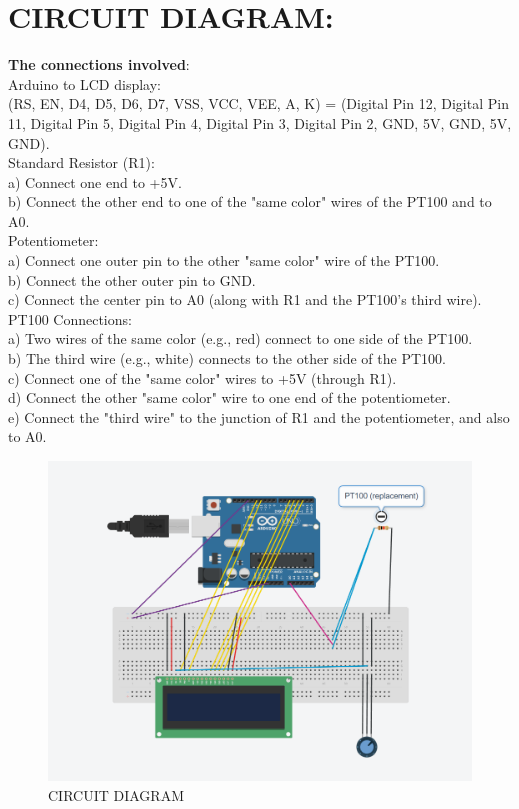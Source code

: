 \documentclass{article}
\begin{document}
\section{CIRCUIT DIAGRAM:}
\textbf{The connections involved}:\\
Arduino to LCD display:\\ 
(RS, EN, D4, D5, D6, D7, VSS, VCC, VEE, A, K) = (Digital Pin 12, Digital Pin 11, Digital Pin 5, Digital Pin 4, Digital Pin 3, Digital Pin 2, GND, 5V, GND, 5V, GND).\\
Standard Resistor (R1):\\
a) Connect one end to +5V.\\
b) Connect the other end to one of the "same color" wires of the PT100 and to A0.\\
Potentiometer:\\
a) Connect one outer pin to the other "same color" wire of the PT100.\\
b) Connect the other outer pin to GND.\\
c) Connect the center pin to A0 (along with R1 and the PT100's third wire).\\
PT100 Connections:\\
a) Two wires of the same color (e.g., red) connect to one side of the PT100.\\
b) The third wire (e.g., white) connects to the other side of the PT100.\\
c) Connect one of the "same color" wires to +5V (through R1).\\
d) Connect the other "same color" wire to one end of the potentiometer.\\
e) Connect the "third wire" to the junction of R1 and the potentiometer, and also to A0.

\begin{figure}[h]
    \centering
    \includegraphics[width=0.8\linewidth]{image3.png}
    \caption{CIRCUIT DIAGRAM}
\end{figure}
\end{document}
